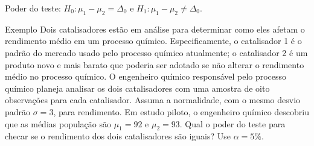 \documentclass[9pt]{beamer}
\begin{document}
\begin{frame}{Poder do teste: $H_0:\mu_1 - \mu_2 = \Delta_0$ e $H_1: \mu_1 - \mu_2 \neq \Delta_0$.}

\begin{block}{Exemplo}
	Dois catalisadores estão em análise para determinar como eles afetam o rendimento médio em um processo químico. Especificamente, o catalisador 1 é o padrão do mercado usado pelo processo químico atualmente; o catalisador 2 é um produto novo e mais barato que poderia ser adotado se não alterar o rendimento médio no processo químico. O engenheiro químico responsável pelo processo químico planeja analisar os dois catalisadores com uma amostra de oito observações para cada catalisador. Assuma a normalidade, com o mesmo desvio padrão $\sigma=3$, para rendimento. Em estudo piloto, o engenheiro químico descobriu que as médias população são $\mu_1 = 92$ e $\mu_2 = 93$.  Qual o poder do teste para checar se o rendimento dos dois catalisadores são iguais? Use $\alpha=5\%$. 
\end{block}

\end{frame}
\end{document}
